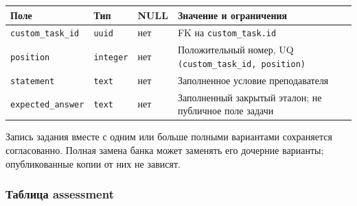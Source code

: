 \documentclass[12pt,a4paper]{article}
\newcounter{none} %
\begin{document}
{\def\LTcaptype{none} %
\begin{longtable}[]{@{}
  >{\raggedright\arraybackslash}p{}
  >{\raggedright\arraybackslash}p{}
  >{\raggedright\arraybackslash}p{}
  >{\raggedright\arraybackslash}p{}@{}}
\toprule\noalign{}
\begin{minipage}[b]{\linewidth}\raggedright
Поле
\end{minipage} & \begin{minipage}[b]{\linewidth}\raggedright
Тип
\end{minipage} & \begin{minipage}[b]{\linewidth}\raggedright
NULL
\end{minipage} & \begin{minipage}[b]{\linewidth}\raggedright
Значение и ограничения
\end{minipage} \\
\midrule\noalign{}
\endhead
\bottomrule\noalign{}
\endlastfoot
\texttt{custom\_\allowbreak{}task\_\allowbreak{}id} & \texttt{uuid} & нет & FK на \texttt{custom\_\allowbreak{}task.\allowbreak{}id} \\
\texttt{position} & \texttt{integer} & нет & Положительный номер, UQ \texttt{(custom\_\allowbreak{}task\_\allowbreak{}id, position)} \\
\texttt{statement} & \texttt{text} & нет & Заполненное условие преподавателя \\
\texttt{expected\_\allowbreak{}answer} & \texttt{text} & нет & Заполненный закрытый эталон; не публичное поле задачи \\
\end{longtable}
}

Запись задания вместе с одним или больше полными вариантами сохраняется согласованно. Полная замена банка может заменять его дочерние варианты; опубликованные копии от них не зависят.

\subsubsection{Таблица assessment}\label{ux442ux430ux431ux43bux438ux446ux430-assessment}

\hypertarget{таблица-assessment}{}
\end{document}
